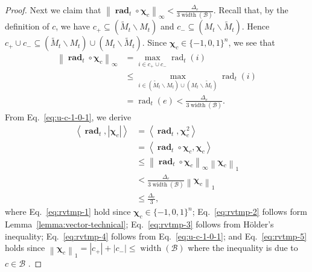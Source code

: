 \documentclass{article}
\newcommand{\B}{\mathcal B}
\newcommand{\del}{\backslash}
\DeclareMathOperator{\rank}{width}
\DeclareMathOperator{\rad}{rad}
\newcommand{\inn}[1]{\left\langle #1 \right\rangle}
\newcommand{\nor}[1]{\left\|#1\right\|}
\renewcommand{\vec}[1]{\boldsymbol{#1}}
\renewcommand{\odot}{\circ}
\begin{document}
\begin{proof}
Next we claim that $\nor{\vec \rad_t \odot \vec \chi_c}_\infty < \frac{\Delta_e}{3\rank(\B)}$.
Recall that, by the definition of $c$, we have
$c_+\subseteq (\tilde M_t \del M_t)$ and $c_-\subseteq (M_t\del \tilde M_t)$. 
Hence $c_+\cup c_- \subseteq  (\tilde M_t \del M_t)\cup (M_t\del \tilde M_t)$.
Since $\vec \chi_c \in \{-1,0,1\}^n$, we see that 
\begin{align}
\nor{\vec \rad_t \odot \vec \chi_c}_\infty &= \max_{i\in  c_+\cup c_-} \rad_t(i) \nonumber \\
									    &\le \max_{i\in  (\tilde M_t \del M_t)\cup (M_t\del \tilde M_t)} \rad_t(i)  \nonumber \\
									    &= \rad_t(e) < \frac{\Delta_e}{3\rank(\B)} \label{eq:u-c-1-0-1}.
\end{align}
From Eq.~\eqref{eq:u-c-1-0-1}, we derive
\begin{align}
\inn{\vec \rad_t, |\vec \chi_c|} &= \inn{\vec\rad_t, \vec\chi_c^2} \label{eq:rvtmp-1}\\
																 &= \inn{\vec\rad_t \odot\vec\chi_c, \vec\chi_c} \label{eq:rvtmp-2}\\
																 &\le \nor{\vec\rad_t\odot \vec\chi_c}_\infty \nor{\vec\chi_c}_1 \label{eq:rvtmp-3}\\
																 &< \frac{\Delta_e}{3\rank(\B)}\nor{\vec\chi_c}_1 \label{eq:rvtmp-4}\\
																 &\le \frac{\Delta_e}{3}\label{eq:rvtmp-5},
\end{align}
where Eq.~\eqref{eq:rvtmp-1} hold since $\vec\chi_c \in \{-1,0,1\}^n$; 
Eq.~\eqref{eq:rvtmp-2} follows form Lemma~\ref{lemma:vector-technical};
Eq.~\eqref{eq:rvtmp-3} follows from H\"older's inequality;
Eq.~\eqref{eq:rvtmp-4} follows from Eq.~\eqref{eq:u-c-1-0-1};
and Eq.~\eqref{eq:rvtmp-5} holds since $\nor{\vec\chi_c}_1=|c_+|+|c_-| \le \rank(\B)$ where the inequality is due to $c\in \B$ .


\end{proof}
\end{document}
